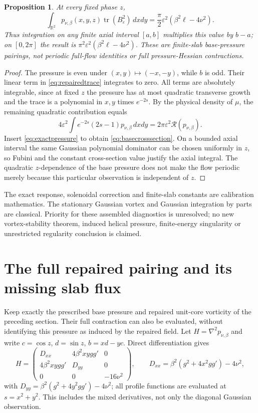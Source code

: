\documentclass[11pt]{article}
\newtheorem{proposition}[theorem]{Proposition}
\begin{document}
\begin{proposition}\label{prop:basepair}
At every fixed phase $z$,
\begin{equation}\label{eq:basecrosssection}
 \int_{\mathbb R^2}p_{\nu,\beta}(x,y,z)
            \operatorname{tr}(B_\varepsilon^2)\,dxdy
 =\frac\pi2\varepsilon^2(\beta^2\ell-4\nu^2).
\end{equation}
Thus integration on any finite axial interval $[a,b]$ multiplies this
value by $b-a$; on $[0,2\pi]$ the result is
$\pi^2\varepsilon^2(\beta^2\ell-4\nu^2)$.
These are finite-slab base-pressure pairings, not periodic full-flow
identities or full pressure-Hessian contractions.
\end{proposition}
\begin{proof}
The pressure is even under $(x,y)\mapsto(-x,-y)$, while $b$ is odd.
Their linear term in \eqref{eq:repairedtrace} integrates to zero.
All terms are absolutely integrable, since at fixed $z$ the pressure
has at most quadratic transverse growth and the trace is a polynomial
in $x,y$ times $e^{-2s}$. By the physical density of $\mu$, the remaining
quadratic contribution equals
\[
 4\varepsilon^2\int e^{-2s}(2s-1)p_{\nu,\beta}\,dxdy
 =2\pi\varepsilon^2\mathcal R(p_{\nu,\beta}).
\]
Insert \eqref{eq:exactpressure} to obtain
\eqref{eq:basecrosssection}. On a bounded axial interval the same
Gaussian polynomial dominator can be chosen uniformly in $z$, so
Fubini and the constant cross-section value justify the axial integral.
The quadratic $z$-dependence of the base pressure does not make the
flow periodic merely because this particular observation is independent
of $z$.
\end{proof}

The exact response, solenoidal correction and finite-slab constants
are calibration mathematics. The stationary Gaussian vortex and
Gaussian integration by parts are classical. Priority for these
assembled diagnostics is unresolved; no new vortex-stability theorem,
induced helical pressure, finite-energy singularity or unrestricted
regularity conclusion is claimed.


\section{The full repaired pairing and its missing slab flux}
Keep exactly the prescribed base pressure and repaired unit-core
vorticity of the preceding section. Their full contraction can also
be evaluated, without identifying this pressure as induced by the
repaired field. Let $H=\nabla^2p_{\nu,\beta}$ and write
$c=\cos z$, $d=\sin z$, $b=xd-yc$. Direct differentiation gives
\[
 H=\begin{pmatrix}
 D_{xx}&4\beta^2xygg'&0\\
 4\beta^2xygg'&D_{yy}&0\\
 0&0&-16\nu^2
 \end{pmatrix},\qquad
 D_{xx}=\beta^2(g^2+4x^2gg')-4\nu^2,
\]
with $D_{yy}=\beta^2(g^2+4y^2gg')-4\nu^2$; all profile functions
are evaluated at $s=x^2+y^2$. This includes the mixed derivatives,
not only the diagonal Gaussian observation.
\end{document}
